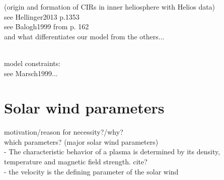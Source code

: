 \citet{Balogh1999} (origin and formation of CIRs in inner heliosphere with Helios data)\\


see Hellinger2013 p.1353\\
see Balogh1999 from p. 162\\
and what differentiates our model from the others...\\\

model constraints:\\
see Marsch1999...\\



\section{Solar wind parameters}	%

%
%


motivation/reason for necessity?/why?\\

which parameters? (major solar wind parameters)\\
- The characteristic behavior of a plasma is determined by its density, temperature and magnetic field strength. cite?\\
- the velocity is the defining parameter of the solar wind\\

